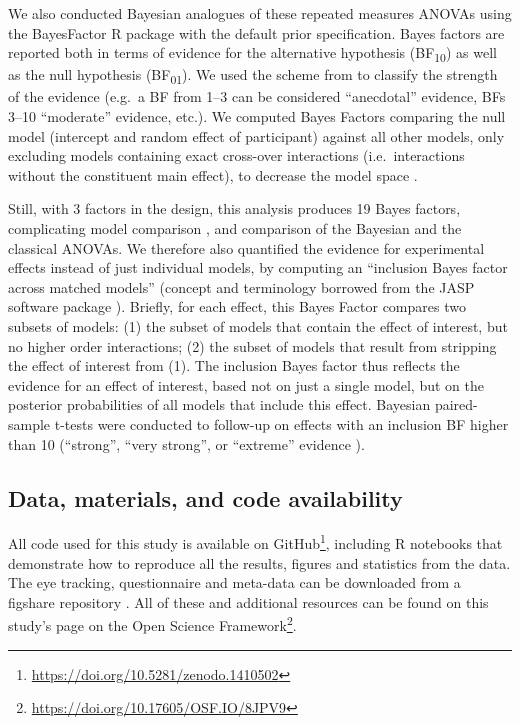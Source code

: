 \documentclass[11pt,]{memoir}
\let\rmarkdownfootnote\footnote%
\def\footnote{\protect\rmarkdownfootnote}
\renewcommand{\href}[2]{#2\footnote{\url{#1}}} %
\begin{document}
We also conducted Bayesian analogues of these repeated measures ANOVAs \autocites{Rouder2012}{Rouder2016} using the BayesFactor R package \autocite{R-BayesFactor} with the default prior specification. Bayes factors are reported both in terms of evidence for the alternative hypothesis (BF\textsubscript{10}) as well as the null hypothesis (BF\textsubscript{01}). We used the scheme from \textcite{Wagenmakers2018} to classify the strength of the evidence (e.g.~a BF from 1--3 can be considered ``anecdotal'' evidence, BFs 3--10 ``moderate'' evidence, etc.). We computed Bayes Factors comparing the null model (intercept and random effect of participant) against all other models, only excluding models containing exact cross-over interactions (i.e.~interactions without the constituent main effect), to decrease the model space \autocite{Rouder2016}.

Still, with 3 factors in the design, this analysis produces 19 Bayes factors, complicating model comparison \autocite{Wagenmakers2018}, and comparison of the Bayesian and the classical ANOVAs. We therefore also quantified the evidence for experimental effects instead of just individual models, by computing an ``inclusion Bayes factor across matched models'' (concept and terminology borrowed from the JASP software package \autocite{JASPTeam2018}). Briefly, for each effect, this Bayes Factor compares two subsets of models: (1) the subset of models that contain the effect of interest, but no higher order interactions; (2) the subset of models that result from stripping the effect of interest from (1). The inclusion Bayes factor thus reflects the evidence for an effect of interest, based not on just a single model, but on the posterior probabilities of all models that include this effect. Bayesian paired-sample t-tests were conducted to follow-up on effects with an inclusion BF higher than 10 (``strong'', ``very strong'', or ``extreme'' evidence \autocite{Wagenmakers2018}).

\hypertarget{data-materials-and-code-availability}{%
\subsection{Data, materials, and code availability}\label{data-materials-and-code-availability}}

All code used for this study is available \href{https://doi.org/10.5281/zenodo.1410502}{on GitHub}, including R notebooks \autocites{Xie2015}{Xie2016} that demonstrate how to reproduce all the results, figures and statistics from the data. The eye tracking, questionnaire and meta-data can be downloaded from a figshare repository \autocite{Reteig2018}. All of these and additional resources can be found on this study's page \href{https://doi.org/10.17605/OSF.IO/8JPV9}{on the Open Science Framework}.
\end{document}
